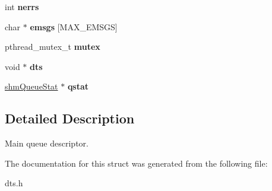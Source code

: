 \begin{CompactItemize}
\item 
\hypertarget{structdtsQueue_c8d30f9744236655f4fe14cb7e1ea8f1}{
int \textbf{nerrs}}
\label{structdtsQueue_c8d30f9744236655f4fe14cb7e1ea8f1}

\item 
\hypertarget{structdtsQueue_16a8107456361ff965b02d338f90556a}{
char $\ast$ \textbf{emsgs} \mbox{[}MAX\_\-EMSGS\mbox{]}}
\label{structdtsQueue_16a8107456361ff965b02d338f90556a}

\item 
\hypertarget{structdtsQueue_9bffe9ccfeb50aa19753b6de30984596}{
pthread\_\-mutex\_\-t \textbf{mutex}}
\label{structdtsQueue_9bffe9ccfeb50aa19753b6de30984596}

\item 
\hypertarget{structdtsQueue_cb262b5bf0ecdb2fccc6776d2e6471d2}{
void $\ast$ \textbf{dts}}
\label{structdtsQueue_cb262b5bf0ecdb2fccc6776d2e6471d2}

\item 
\hypertarget{structdtsQueue_2ae8a1ca957481f937cbf0efb963b64c}{
\hyperlink{structshmQueueStat}{shmQueueStat} $\ast$ \textbf{qstat}}
\label{structdtsQueue_2ae8a1ca957481f937cbf0efb963b64c}

\end{CompactItemize}


\subsection{Detailed Description}
Main queue descriptor. 

The documentation for this struct was generated from the following file:\begin{CompactItemize}
\item 
dts.h\end{CompactItemize}
